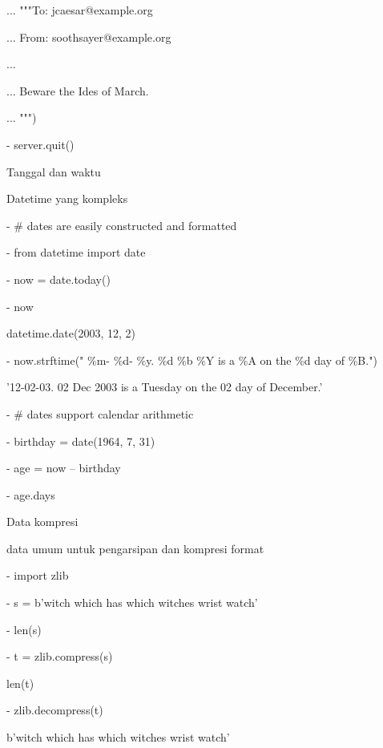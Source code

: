 ... """To: jcaesar@example.org \par
\noindent 
... From: soothsayer@example.org \par
\noindent 
... \par
\noindent 
... Beware the Ides of March. \par
\noindent 
... """) \par
\noindent 
- server.quit() \par
\noindent 
Tanggal dan waktu \par
\noindent 
Datetime yang kompleks \par
\noindent 
-  $  \#  $ dates are easily constructed and formatted \par
\noindent 
- from datetime import date \par
\noindent 
- now = date.today() \par
\noindent 
- now \par
\noindent 
datetime.date(2003, 12, 2) \par
\noindent 
- now.strftime(" $  \%  $m- $  \%  $d- $  \%  $y.  $  \%  $d  $  \%  $b  $  \%  $Y is a  $  \%  $A on the  $  \%  $d day of  $  \%  $B.") \par
\noindent 
'12-02-03. 02 Dec 2003 is a Tuesday on the 02 day of December.' \par
\noindent 
-  $  \#  $ dates support calendar arithmetic \par
\noindent 
- birthday = date(1964, 7, 31) \par
\noindent 
- age = now – birthday \par
\vspace{12pt}
\noindent 
- age.days \par
{} \par
\noindent 
Data kompresi  \par
\noindent 
data umum untuk pengarsipan dan kompresi format \par
\noindent 
- import zlib \par
\noindent 
- s = b'witch which has which witches wrist watch' \par
\noindent 
- len(s) \par
{} \par
\noindent 
- t = zlib.compress(s) \par
\noindent 
 len(t) \par
{} \par
\noindent 
- zlib.decompress(t) \par
\noindent 
b'witch which has which witches wrist watch' \par
